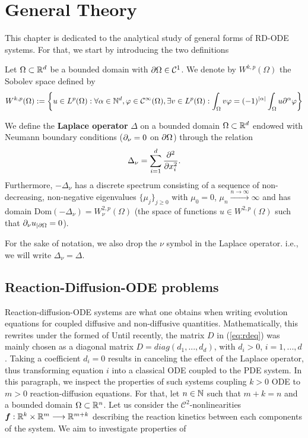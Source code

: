\section{General Theory}

This chapter is dedicated to the analytical study of general forms of RD-ODE systems. For that, we start by introducing the two definitions

\begin{definition}
	Let $\Omega \subset \mathbb{R}^d$ be a bounded domain with $\partial \Omega \in \mathcal C^1$. We denote by $W^{k, p}(\Omega)$ the Sobolev space defined by
	$$W^{k, p}(\Omega) := \left\{ u \in L^p(\Omega) : \forall \alpha \in \mathbb{N}^d, \varphi \in \mathcal C^\infty(\Omega), \exists v \in L^p(\Omega) : \int_\Omega v \varphi = (-1)^{|\alpha|} \int_\Omega u \partial^\alpha \varphi \right\}$$   
\end{definition}

\begin{definition}
	
	We define the \textbf{Laplace operator}  $\Delta$ on a bounded domain $\Omega \subset \mathbb{R}^d$ endowed with Neumann boundary conditions ($\partial_{\nu} = 0$ on $\partial\Omega$) through the relation
	$$\Delta_\nu = \sum_{i=1}^d \frac{\partial^2}{\partial x_i^2}.$$
	Furthermore, $-\Delta_\nu$ has a discrete spectrum consisting of a sequence of non-decreasing, non-negative eigenvalues 
	$\{\mu_j\}_{j\ge 0}$ with $\mu_0 = 0$, $\mu_n \xrightarrow{n \to \infty} \infty$ and has domain $\mathrm{Dom}(-\Delta_\nu) = W_\nu^{2,p}(\Omega)$ (the space of functions $u\in W^{2,p}(\Omega)$ such that $\partial_\nu u_{\vert \partial\Omega} = 0$).
\end{definition}

For the sake of notation, we also  drop the $\nu$ symbol in the Laplace operator. i.e., we will write $\Delta_\nu = \Delta$. 


\subsection{Reaction-Diffusion-ODE problems}

Reaction-diffusion-ODE systems are what one obtains when writing evolution equations for coupled diffusive and non-diffusive quantities. Mathematically, this rewrites under the formed of Until recently, the matrix $D$ in (\ref{eq:rdeq}) was mainly chosen as a diagonal matrix $D = diag(d_1, ..., d_d)$, with $d_i > 0$, $i = 1, ..., d$. Taking a coefficient $d_i = 0$ results in canceling the effect of the Laplace operator, thus transforming equation $i$ into a classical ODE coupled to the PDE system. In this paragraph, we inspect the properties of such systems coupling $k >0$ ODE to $m > 0$ reaction-diffusion equations. For that, let $n \in \mathbb{N}$ such that $m+k = n$ and a bounded domain $\Omega \subset \mathbb{R}^{n}$. Let us consider the $\mathcal{C}^2$-nonlinearities $\bm f : \mathbb{R}^k \times \mathbb{R}^m \longrightarrow \mathbb{R}^{m+k}$ describing the reaction kinetics between each components of the system. We aim to investigate properties of
 
